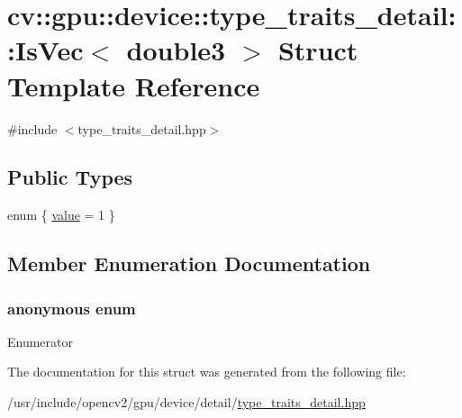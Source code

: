 \hypertarget{structcv_1_1gpu_1_1device_1_1type__traits__detail_1_1IsVec_3_01double3_01_4}{\section{cv\-:\-:gpu\-:\-:device\-:\-:type\-\_\-traits\-\_\-detail\-:\-:Is\-Vec$<$ double3 $>$ Struct Template Reference}
\label{structcv_1_1gpu_1_1device_1_1type__traits__detail_1_1IsVec_3_01double3_01_4}
}


{\ttfamily \#include $<$type\-\_\-traits\-\_\-detail.\-hpp$>$}

\subsection*{Public Types}
\begin{DoxyCompactItemize}
\item 
enum \{ \hyperlink{structcv_1_1gpu_1_1device_1_1type__traits__detail_1_1IsVec_3_01double3_01_4_aa03ee382e2439908c541ef3b21d84077a0f4836f53a8051f542ee49777c18d765}{value} = 1
 \}
\end{DoxyCompactItemize}


\subsection{Member Enumeration Documentation}
\hypertarget{structcv_1_1gpu_1_1device_1_1type__traits__detail_1_1IsVec_3_01double3_01_4_aa03ee382e2439908c541ef3b21d84077}{\subsubsection[{anonymous enum}]{\setlength{\rightskip}{0pt plus 5cm}anonymous enum}}\label{structcv_1_1gpu_1_1device_1_1type__traits__detail_1_1IsVec_3_01double3_01_4_aa03ee382e2439908c541ef3b21d84077}
\begin{Desc}
\item[Enumerator]\par
\begin{description}
\item[{\em 
\hypertarget{structcv_1_1gpu_1_1device_1_1type__traits__detail_1_1IsVec_3_01double3_01_4_aa03ee382e2439908c541ef3b21d84077a0f4836f53a8051f542ee49777c18d765}{value}\label{structcv_1_1gpu_1_1device_1_1type__traits__detail_1_1IsVec_3_01double3_01_4_aa03ee382e2439908c541ef3b21d84077a0f4836f53a8051f542ee49777c18d765}
}]\end{description}
\end{Desc}


The documentation for this struct was generated from the following file\-:\begin{DoxyCompactItemize}
\item 
/usr/include/opencv2/gpu/device/detail/\hyperlink{type__traits__detail_8hpp}{type\-\_\-traits\-\_\-detail.\-hpp}\end{DoxyCompactItemize}
